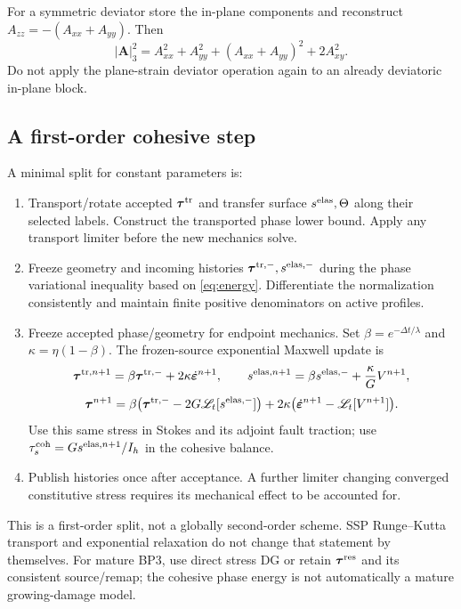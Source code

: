 \documentclass[10pt,letterpaper]{article}
\newcommand{\LL}{\mathscr L}
\newcommand{\ta}{\bm\tau}
\newcommand{\tat}{\bm\tau^{\rm tr}}
\newcommand{\tar}{\bm\tau^{\rm res}}
\newcommand{\erate}{\dot{\bm\varepsilon}}
\newcommand{\sel}{s^{\rm elas}}
\newcommand{\qcoh}{\tau_s^{\rm coh}}
\begin{document}
For a symmetric deviator store the in-plane components and reconstruct $A_{zz}=-(A_{xx}+A_{yy})$. Then
\begin{equation}
 |\bm A|_3^2=A_{xx}^2+A_{yy}^2+(A_{xx}+A_{yy})^2+2A_{xy}^2.
\end{equation}
Do not apply the plane-strain deviator operation again to an already deviatoric in-plane block.

\subsection{A first-order cohesive step}
A minimal split for constant parameters is:
\begin{enumerate}
\item Transport/rotate accepted $\tat$ and transfer surface $\sel,\Theta$ along their selected labels. Construct the transported phase lower bound. Apply any transport limiter before the new mechanics solve.
\item Freeze geometry and incoming histories $\bm\tau^{\rm tr,-},s^{\rm elas,-}$ during the phase variational inequality based on \eqref{eq:energy}. Differentiate the normalization consistently and maintain finite positive denominators on active profiles.
\item Freeze accepted phase/geometry for endpoint mechanics. Set $\beta=e^{-\Delta t/\lambda}$ and $\kappa=\eta(1-\beta)$. The frozen-source exponential Maxwell update is
\begin{equation}
 \bm\tau^{{\rm tr},n+1}=\beta\bm\tau^{\rm tr,-}+2\kappa\erate^{n+1},\qquad
 s^{{\rm elas},n+1}=\beta s^{\rm elas,-}+\frac{\kappa}{G}V^{n+1},
\end{equation}
\begin{equation}
 \ta^{n+1}=\beta\big(\bm\tau^{\rm tr,-} -2G\LL_t[s^{\rm elas,-}]\big)
 +2\kappa\big(\erate^{n+1}-\LL_t[V^{n+1}]\big).
\end{equation}
Use this same stress in Stokes and its adjoint fault traction; use $\qcoh=Gs^{{\rm elas},n+1}/I_h$ in the cohesive balance.
\item Publish histories once after acceptance. A further limiter changing converged constitutive stress requires its mechanical effect to be accounted for.
\end{enumerate}
This is a first-order split, not a globally second-order scheme. SSP Runge--Kutta transport and exponential relaxation do not change that statement by themselves. For mature BP3, use direct stress DG or retain $\tar$ and its consistent source/remap; the cohesive phase energy is not automatically a mature growing-damage model.
\end{document}
